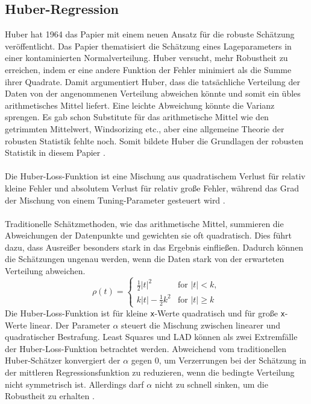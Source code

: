 \subsection{Huber-Regression}
\label{huberregression}
Huber hat 1964 das Papier  mit einem neuen Ansatz für die robuste Schätzung veröffentlicht. Das Papier thematisiert die Schätzung eines Lageparameters in einer kontaminierten Normalverteilung. Huber versucht, mehr Robustheit zu erreichen, indem er eine andere Funktion der Fehler minimiert als die Summe ihrer Quadrate. Damit argumentiert Huber, dass die tatsächliche Verteilung der Daten von der angenommenen Verteilung abweichen könnte und somit ein übles arithmetisches Mittel liefert. Eine leichte Abweichung könnte die Varianz sprengen. Es gab schon Substitute für das arithmetische Mittel wie den getrimmten Mittelwert, Windsorizing etc., aber eine allgemeine Theorie der robusten Statistik fehlte noch. Somit bildete Huber die Grundlagen der robusten Statistik in diesem Papier \cite{huberpapier}. \\\\
Die Huber-Loss-Funktion ist eine Mischung aus quadratischem Verlust für relativ kleine Fehler und absolutem Verlust für relativ große Fehler, während das Grad der Mischung von einem Tuning-Parameter gesteuert wird \cite{indirekthuber}. 
\\\\
Traditionelle Schätzmethoden, wie das arithmetische Mittel, summieren die Abweichungen der Datenpunkte und gewichten sie oft quadratisch. Dies führt dazu, dass Ausreißer besonders stark in das Ergebnis einfließen. Dadurch können die Schätzungen ungenau werden, wenn die Daten stark von der erwarteten Verteilung abweichen.   
\begin{equation}
\rho(t) = 
\begin{cases} 
  \frac{1}{2} |t|^2 & \text{for } |t| < k, \\ 
  k |t| - \frac{1}{2} k^2 & \text{for } |t| \geq k 
\end{cases}
\label{eq:huber}
\end{equation}
Die Huber-Loss-Funktion ist für kleine \verb|x|-Werte quadratisch und für große \verb|x|-Werte linear. Der Parameter $\alpha$ steuert die Mischung zwischen linearer und quadratischer Bestrafung. Least Squares und \ac{LAD} können als zwei Extremfälle der Huber-Loss-Funktion betrachtet werden. Abweichend vom traditionellen Huber-Schätzer konvergiert der $\alpha$ gegen 0, um Verzerrungen bei der Schätzung in der mittleren Regressionsfunktion zu reduzieren, wenn die bedingte Verteilung nicht symmetrisch ist. Allerdings darf $\alpha$ nicht zu schnell sinken, um die Robustheit zu erhalten \cite{indirekthuber}.   
 